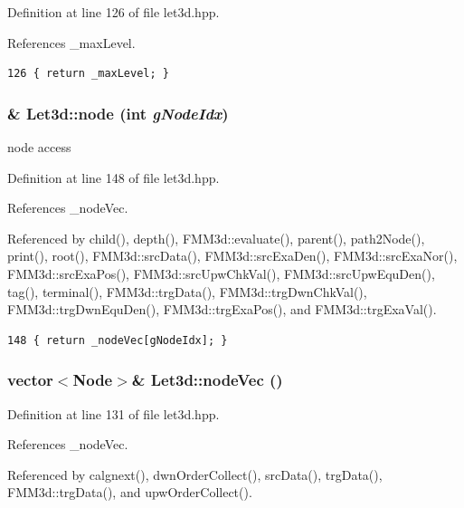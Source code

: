 Definition at line 126 of file let3d.hpp.

References \_\-max\-Level.

\footnotesize\begin{verbatim}126 { return _maxLevel; }
\end{verbatim}\normalsize 


\subsubsection{\& Let3d::node (int {\em g\-Node\-Idx})\hspace{0.3cm}{\tt  [inline]}}\label{classLet3d_f259ccf218dbf0a04530841785f1a8b0_f259ccf218dbf0a04530841785f1a8b0}


node access 

Definition at line 148 of file let3d.hpp.

References \_\-node\-Vec.

Referenced by child(), depth(), FMM3d::evaluate(), parent(), path2Node(), print(), root(), FMM3d::src\-Data(), FMM3d::src\-Exa\-Den(), FMM3d::src\-Exa\-Nor(), FMM3d::src\-Exa\-Pos(), FMM3d::src\-Upw\-Chk\-Val(), FMM3d::src\-Upw\-Equ\-Den(), tag(), terminal(), FMM3d::trg\-Data(), FMM3d::trg\-Dwn\-Chk\-Val(), FMM3d::trg\-Dwn\-Equ\-Den(), FMM3d::trg\-Exa\-Pos(), and FMM3d::trg\-Exa\-Val().

\footnotesize\begin{verbatim}148 { return _nodeVec[gNodeIdx]; }
\end{verbatim}\normalsize 


\subsubsection{\setlength{\rightskip}{0pt plus 5cm}vector$<${\bf Node}$>$\& Let3d::node\-Vec ()\hspace{0.3cm}{\tt  [inline]}}\label{classLet3d_44c0c8da466878274feb4ce060c10b9b_44c0c8da466878274feb4ce060c10b9b}




Definition at line 131 of file let3d.hpp.

References \_\-node\-Vec.

Referenced by calgnext(), dwn\-Order\-Collect(), src\-Data(), trg\-Data(), FMM3d::trg\-Data(), and upw\-Order\-Collect().

